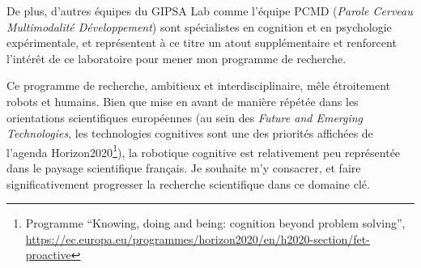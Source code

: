 \documentclass[a4paper]{article}
\begin{document}
De plus, d'autres équipes du GIPSA Lab comme l'équipe PCMD (\emph{Parole
Cerveau Multimodalité Développement}) sont spécialistes en cognition et en
psychologie expérimentale, et représentent à ce titre un atout supplémentaire et
renforcent l'intérêt de ce laboratoire pour mener mon programme de recherche.

Ce programme de recherche, ambitieux et interdisciplinaire, mêle étroitement
robots et humains. Bien que mise en avant de manière répétée dans les
orientations scientifiques européennes (au sein des \emph{Future and Emerging
Technologies}, les technologies cognitives sont une des priorités affichées de
l'agenda Horizon2020\footnote{Programme ``Knowing, doing and being: cognition
beyond problem solving'',
\url{https://ec.europa.eu/programmes/horizon2020/en/h2020-section/fet-proactive}}),
la robotique cognitive est relativement peu représentée dans le paysage
scientifique français. Je souhaite m'y consacrer, et faire significativement
progresser la recherche scientifique dans ce domaine clé.

\printbibliography
\end{document}
